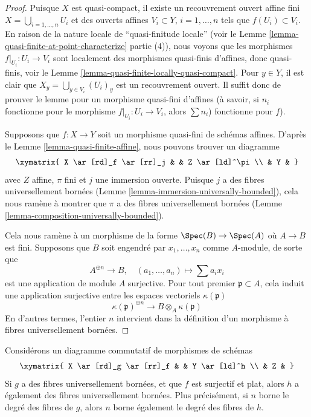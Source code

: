 \begin{proof}
Puisque $X$ est quasi-compact, il existe un recouvrement
ouvert affine fini $X = \bigcup_{i = 1, \ldots, n} U_i$ et des ouverts affines $V_i \subset Y$,
$i = 1, \ldots, n$ tels que $f(U_i) \subset V_i$. En raison
de la nature locale de ``quasi-finitude
locale'' (voir le Lemme \ref{lemma-quasi-finite-at-point-characterize} partie (4)), nous
voyons que les morphismes $f|_{U_i} : U_i \to V_i$ sont localement
des morphismes quasi-finis d'affines, donc quasi-finis,
voir le Lemme \ref{lemma-quasi-finite-locally-quasi-compact}. Pour $y \in Y$,
il est clair que $X_y = \bigcup_{y \in V_i} (U_i)_y$ est un recouvrement ouvert. Il
suffit donc de prouver le lemme pour un morphisme
quasi-fini d'affines (à savoir, si $n_i$ fonctionne
pour le morphisme $f|_{U_i} : U_i \to V_i$, alors $\sum n_i$)
fonctionne pour $f$).

\medskip\noindent Supposons
que $f : X \to Y$ soit un morphisme quasi-fini de schémas affines.
D'après le Lemme \ref{lemma-quasi-finite-affine}, nous pouvons
trouver un diagramme
$$
\xymatrix{
X \ar[rd]_f \ar[rr]_j & & Z \ar[ld]^\pi \\
& Y &
}
$$
avec $Z$ affine, $\pi$ fini et $j$ une immersion
ouverte. Puisque $j$
a des fibres universellement bornées (Lemme
\ref{lemma-immersion-universally-bounded}), cela nous ramène à montrer que $\pi$ a
des fibres universellement bornées (Lemme \ref{lemma-composition-universally-bounded}).

\medskip\noindent Cela
nous ramène à un morphisme de la forme $\Spec(B) \to \Spec(A)$ où $A \to B$ est fini.
Supposons que $B$ soit engendré par $x_1, \ldots, x_n$ comme $A$-module,
de sorte que
$$
A^{\oplus n} \longrightarrow B, \quad
(a_1, \ldots, a_n) \longmapsto \sum a_i x_i
$$
est une application de module $A$ surjective. Pour tout premier $\mathfrak p \subset A$, cela
induit une application surjective entre les espaces vectoriels $\kappa(\mathfrak p)$
$$
\kappa(\mathfrak p)^{\oplus n} \longrightarrow B \otimes_A \kappa(\mathfrak p)
$$
En d'autres termes, l'entier $n$ intervient dans la définition
d'un morphisme à fibres universellement bornées.
\end{proof}

\begin{lemma}
\label{lemma-universally-bounded-permanence}
Considérons un diagramme commutatif de morphismes de schémas
$$
\xymatrix{
X \ar[rd]_g \ar[rr]_f & & Y \ar[ld]^h \\
& Z &
}
$$
Si $g$ a des fibres universellement bornées, et que $f$ est surjectif et plat,
alors $h$ a également des fibres universellement bornées. Plus précisément, si $n$
borne le degré des fibres de $g$, alors $n$ borne également
le degré des fibres de $h$.
\end{lemma}

